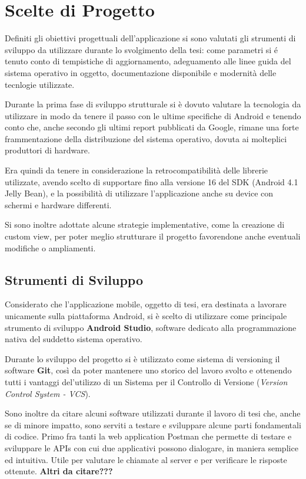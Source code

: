 \section{Scelte di Progetto}

Definiti gli obiettivi progettuali dell'applicazione si sono valutati gli strumenti di sviluppo da utilizzare durante lo svolgimento della tesi: come parametri si é tenuto conto di tempistiche di aggiornamento, adeguamento alle linee guida del sistema operativo in oggetto, documentazione disponibile e modernità delle tecnlogie utilizzate.

Durante la prima fase di sviluppo strutturale si è dovuto valutare la tecnologia da utilizzare in modo da tenere il passo con le ultime specifiche di Android e tenendo conto che, anche secondo gli ultimi report pubblicati da Google, rimane una forte frammentazione della distribuzione del sistema operativo, dovuta ai molteplici produttori di hardware. \autocite{ANDROIDSTUDIO:DASHBOARD}

Era quindi da tenere in considerazione la retrocompatibilità delle librerie utilizzate, avendo scelto di supportare fino alla versione 16 del SDK (Android 4.1 Jelly Bean), e la possibilità di utilizzare l'applicazione anche su device con schermi e hardware differenti.

Si sono inoltre adottate alcune strategie implementative, come la creazione di custom view, per poter meglio strutturare il progetto favorendone anche eventuali modifiche o ampliamenti.

\subsection{Strumenti di Sviluppo}
Considerato che l'applicazione mobile, oggetto di tesi, era destinata a lavorare unicamente sulla piattaforma Android, si è scelto di utilizzare come principale strumento di sviluppo \textbf{Android Studio}, software dedicato alla programmazione nativa del suddetto sistema operativo. \autocite{ANDROIDDEVELOPERS:FIRSTAPP}

Durante lo sviluppo del progetto si è utilizzato come sistema di versioning il software \textbf{Git}, così da poter mantenere uno storico del lavoro svolto e ottenendo tutti i vantaggi del'utilizzo di un Sistema per il Controllo di Versione (\textit{Version Control System - VCS}).

Sono inoltre da citare alcuni software utilizzati durante il lavoro di tesi che, anche se di minore impatto, sono serviti a testare e sviluppare alcune parti fondamentali di codice.
Primo fra tanti la web application Postman \autocite{POSTMAN} che permette di testare e sviluppare le APIs con cui due applicativi possono dialogare, in maniera semplice ed intuitiva. Utile per valutare le chiamate al server e per verificare le risposte ottenute.
\textbf{Altri da citare???}

